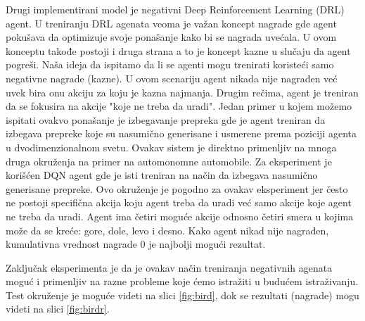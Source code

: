 Drugi implementirani model je negativni Deep Reinforcement Learning (DRL) agent. U treniranju DRL agenata veoma je važan koncept nagrade gde agent pokušava da optimizuje svoje ponašanje kako bi se nagrada uvećala. U ovom konceptu takođe postoji i druga strana a to je koncept kazne u slučaju da agent pogreši. Naša ideja da ispitamo da li se agenti mogu trenirati koristeći samo negativne nagrade (kazne). U ovom scenariju agent nikada nije nagrađen već uvek bira onu akciju za koju je kazna najmanja. Drugim rečima, agent je treniran da se fokusira na akcije "koje ne treba da uradi". Jedan primer u kojem možemo ispitati ovakvo ponašanje je izbegavanje prepreka gde je agent treniran da izbegava prepreke koje su nasumično generisane i usmerene prema poziciji agenta u dvodimenzionalnom svetu. Ovakav sistem je direktno primenljiv na mnoga druga okruženja na primer na automonomne automobile. Za eksperiment je korišćen DQN \cite{mnih2013playing} agent gde je isti treniran na način da izbegava nasumično generisane prepreke. Ovo okruženje je pogodno za ovakav eksperiment jer često ne postoji specifična akcija koju agent treba da uradi već samo akcije koje agent ne treba da uradi. Agent ima četiri moguće akcije odnosno četiri smera u kojima može da se kreće: gore, dole, levo i desno. Kako agent nikad nije nagrađen, kumulativna vrednost nagrade $ 0 $ je najbolji mogući rezultat. 

Zaključak eksperimenta je da je ovakav način treniranja negativnih agenata moguć i primenljiv na razne probleme koje ćemo istražiti u budućem istraživanju. Test okruženje je moguće videti na slici \ref{fig:bird}, dok se rezultati (nagrade) mogu videti na slici \ref{fig:birdr}.

